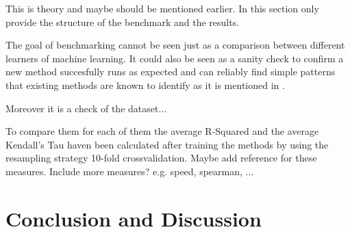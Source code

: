\documentclass[a4paper]{article}
\begin{document}
\color{red} This is theory and maybe should be mentioned earlier. In this section only provide the structure of the benchmark and the results. \color{black}

The goal of benchmarking cannot be seen just as a comparison between different learners of machine learning.
It could also be seen as a sanity check to confirm a new method succesfully runs as expected and can reliably find simple patterns that existing methods are known to identify as it is mentioned in \citet{Hastie2009}. 

\color{red} Moreover it is a check of the dataset... \color{black}

To compare them for each of them the average R-Squared and the average Kendall's Tau haven been calculated after training the methods by using the resampling strategy 10-fold crossvalidation. \color{red} Maybe add reference for these measures. Include more measures? e.g. speed, spearman, ...\color{black}

\section{Conclusion and Discussion}
\label{sec:conclusion}

\FloatBarrier


\end{document}

